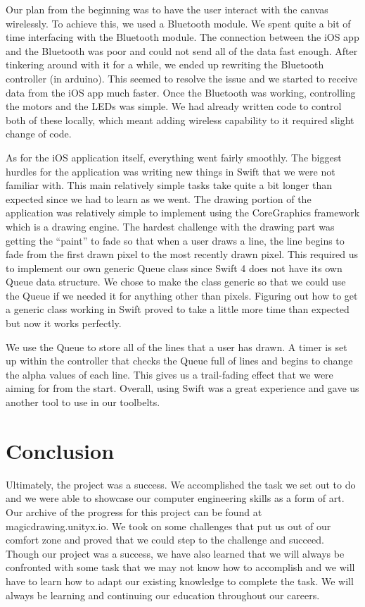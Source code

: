 \documentclass[11pt]{IEEEtran}
\begin{document}
Our plan from the beginning was to have the user interact with the canvas wirelessly. To achieve this, we used a Bluetooth module. We spent quite a bit of time interfacing with the Bluetooth module. The connection between the iOS app and the Bluetooth was poor and could not send all of the data fast enough. After tinkering around with it for a while, we ended up rewriting the Bluetooth controller (in arduino). This seemed to resolve the issue and we started to receive data from the iOS app much faster. Once the Bluetooth was working, controlling the motors and the LEDs was simple. We had already written code to control both of these locally, which meant adding wireless capability to it required slight change of code.

As for the iOS application itself, everything went fairly smoothly. The biggest hurdles for the application was writing new things in Swift that we were not familiar with. This main relatively simple tasks take quite a bit longer than expected since we had to learn as we went. The drawing portion of the application was relatively simple to implement using the CoreGraphics framework which is a drawing engine. The hardest challenge with the drawing part was getting the “paint” to fade so that when a user draws a line, the line begins to fade from the first drawn pixel to the most recently drawn pixel. This required us to implement our own generic Queue class since Swift 4 does not have its own Queue data structure. We chose to make the class generic so that we could use the Queue if we needed it for anything other than pixels. Figuring out how to get a generic class working in Swift proved to take a little more time than expected but now it works perfectly.

We use the Queue to store all of the lines that a user has drawn. A timer is set up within the controller that checks the Queue full of lines and begins to change the alpha values of each line. This gives us a trail-fading effect that we were aiming for from the start. Overall, using Swift was a great experience and gave us another tool to use in our toolbelts.

\section{Conclusion}
Ultimately, the project was a success. We accomplished the task we set out to do and we were able to showcase our computer engineering skills as a form of art. Our archive of the progress for this project can be found at magicdrawing.unityx.io. We took on some challenges that put us out of our comfort zone and proved that we could step to the challenge and succeed. Though our project was a success, we have also learned that we will always be confronted with some task that we may not know how to accomplish and we will have to learn how to adapt our existing knowledge to complete the task. We will always be learning and continuing our education throughout our careers.
\end{document}
